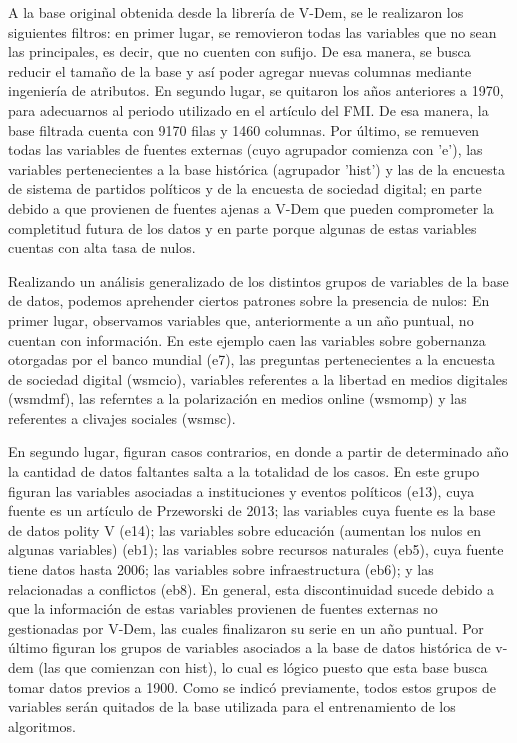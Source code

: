 \documentclass{article}
\begin{document}
A la base original obtenida desde la librería de V-Dem, se le realizaron los
siguientes filtros: en primer lugar, se removieron todas las variables que
no sean las principales, es decir, que no cuenten con sufijo. De esa manera,
se busca reducir el tamaño de la base y así poder agregar nuevas columnas
mediante ingeniería de atributos. En segundo lugar, se quitaron los años 
anteriores a 1970, para adecuarnos al periodo utilizado en el artículo del FMI.
De esa manera, la base filtrada cuenta con 9170 filas y 1460 columnas. Por último,
se remueven todas las variables de fuentes externas (cuyo agrupador comienza con
'e'), las variables pertenecientes a la base histórica (agrupador 'hist') y las
de la encuesta de sistema de partidos políticos y de la encuesta de sociedad digital; 
en parte debido a que provienen
de fuentes ajenas a V-Dem que pueden comprometer la completitud futura de los datos
y en parte porque algunas de estas variables cuentas con alta tasa de nulos.

Realizando un análisis generalizado de los distintos grupos de variables de la base de
datos, podemos aprehender ciertos patrones sobre la presencia de nulos: 
En primer lugar, observamos variables que,
anteriormente a un año puntual, no cuentan con información. En este ejemplo caen
las variables sobre gobernanza otorgadas por el banco mundial (e7), las preguntas
pertenecientes a la encuesta de sociedad digital (wsmcio), variables referentes a
la libertad en medios digitales (wsmdmf), las referntes a la polarización en medios
online (wsmomp) y las referentes a clivajes sociales (wsmsc).

En segundo lugar, figuran casos contrarios, en donde a partir de determinado año
la cantidad de datos faltantes salta a la totalidad de los casos. En este grupo
figuran las variables asociadas a instituciones y eventos políticos (e13), cuya 
fuente es un artículo de Przeworski de 2013; las variables cuya fuente es la base
de datos polity V (e14); las variables sobre educación (aumentan los nulos en 
algunas variables) (eb1); las variables sobre recursos naturales (eb5), cuya fuente 
tiene datos hasta 2006; las variables sobre infraestructura (eb6); y las relacionadas 
a conflictos (eb8). En general, esta discontinuidad sucede debido a que la 
información de estas variables provienen de fuentes externas no gestionadas por 
V-Dem, las cuales finalizaron su serie en un año puntual. Por último figuran los 
grupos de variables asociados a la base de datos histórica de v-dem (las que comienzan 
con hist), lo cual es lógico puesto que esta base busca tomar datos previos a 1900.
Como se indicó previamente, todos estos grupos de variables serán quitados de la base
utilizada para el entrenamiento de los algoritmos.
\end{document}
